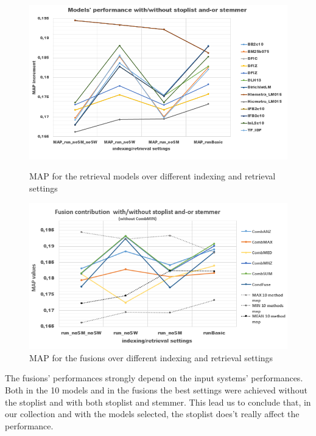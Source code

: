 	\begin{figure}[H]
		\begin{minipage}{0.5\linewidth}
			\centering
			\includegraphics[width=\linewidth]{../eval/results-img-graphs/MAPModSMSW.png}
			\caption{MAP for the retrieval models over different indexing and retrieval settings}				
			\label{fig:MAPMod}
		\end{minipage}
		\begin{minipage}{0.5\linewidth}
			\centering
			\includegraphics[width=\linewidth]{../eval/results-img-graphs/MAPFusSMSW.png}
			\caption{MAP for the fusions over different indexing and retrieval settings}				
			\label{fig:MAPFus}
		\end{minipage}
	\end{figure}

	The fusions' performances strongly depend on the input systems' performances. Both in the 10 models and in the fusions the best settings were achieved without the stoplist and with both stoplist and stemmer.
	This lead us to conclude that, in our collection and with the models selected, the stoplist does't really affect the performance.
	
